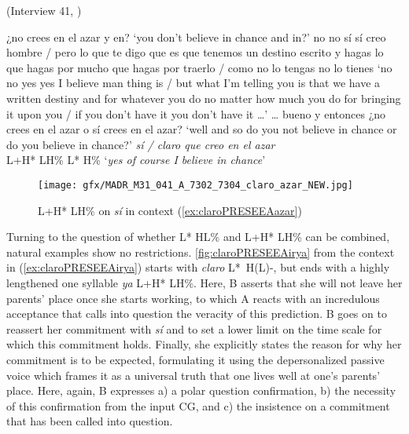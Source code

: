 \begin{exe}
\ex \label{ex:claroPRESEEAazar} (Interview 41, \cite{PRESEEA.20142020})
	 \begin{xlist}[A:]
     ¿no crees en el azar y en?
	\glt `you don't believe in chance and in?'
	 no no sí sí creo hombre / pero lo que te digo que es que tenemos un destino escrito y hagas lo que hagas por mucho que hagas por traerlo / como no lo tengas no lo tienes
	\glt `no no yes yes I believe man thing is / but what I'm telling you is that we have a written destiny and for whatever you do no matter how much you do for bringing it upon you / if you don't have it you don't have it \ldots'
	\exi {} \ldots
	 bueno y entonces ¿no crees en el azar o sí crees en el azar? 
	\glt `well and so do you not believe in chance or do you believe in chance?'
	 \textit{sí \hspace*{1.5em}/ claro que creo en el azar} \\
	L+H* LH\% \hspace{7em} L* H\%
	\glt `\textit{yes of course I believe in chance}'
	\end{xlist}
\end{exe}\largerpage

\begin{figure}
	\texttt{[image: gfx/MADR\_M31\_041\_A\_7302\_7304\_claro\_azar\_NEW.jpg]}
	\caption[L+H* LH\% on \textit{sí} in context (\ref{ex:claroPRESEEAazar})]{L+H* LH\% on \textit{sí} in context (\ref{ex:claroPRESEEAazar}) \href{https://osf.io/y38tf/}{\faVolumeUp} \label{fig:claroPRESEEAazar}}
\end{figure}

Turning to the question of whether L* HL\% and L+H* LH\% can be combined, natural examples show no restrictions. \autoref{fig:claroPRESEEAirya} from the context in (\ref{ex:claroPRESEEAirya}) starts with \textit{claro} L*~H(L)-, but ends with a highly lengthened one syllable \textit{ya} L+H* LH\%. Here, B asserts that she will not leave her parents' place once she starts working, to which A reacts with an incredulous acceptance that calls into question the veracity of this prediction. B goes on to reassert her commitment with \textit{sí} and to set a lower limit on the time scale for which this commitment holds. Finally, she explicitly states the reason for why her commitment is to be expected, formulating it using the depersonalized passive voice which frames it as a universal truth that one lives well at one's parents' place. Here, again, B expresses a) a polar question confirmation, b) the necessity of this confirmation from the input \ac{CG}, and c) the insistence on a commitment that has been called into question.


